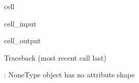 \documentclass[letterpaper,10pt,english]{jupyterBook}
\begin{document}
\begin{sphinxuseclass}{cell}\begin{sphinxVerbatimInput}

\begin{sphinxuseclass}{cell_input}
\begin{sphinxVerbatim}[commandchars=\\\{\}]
\end{sphinxVerbatim}

\end{sphinxuseclass}\end{sphinxVerbatimInput}
\begin{sphinxVerbatimOutput}

\begin{sphinxuseclass}{cell_output}
\begin{sphinxVerbatim}[commandchars=\\\{\}]
Traceback (most recent call last)
 \PYG{p}{[}\PYG{p}{]}  
 

: \PYGZsq{}NoneType\PYGZsq{} object has no attribute \PYGZsq{}shape\PYGZsq{}
\end{sphinxVerbatim}

\end{sphinxuseclass}\end{sphinxVerbatimOutput}

\end{sphinxuseclass}
\end{document}
